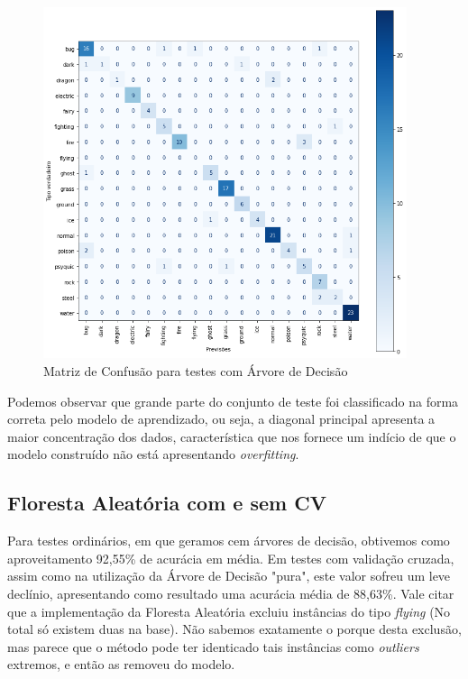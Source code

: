 \documentclass[12pt]{article}
\begin{document}
\begin{figure}[H]
    \centering
    \includegraphics[width=0.95\textwidth]{Images/confusion_matrix_tree.png}
    \caption{Matriz de Confusão para testes com Árvore de Decisão}
    \label{fig:exampleFig5}
\end{figure}

Podemos observar que grande parte do conjunto de teste foi classificado na forma correta pelo modelo de aprendizado, ou seja, a diagonal principal apresenta a maior concentração dos dados, característica que nos fornece um indício de que o modelo construído não está apresentando \emph{overfitting}.

\subsection{Floresta Aleatória com e sem CV}

Para testes ordinários, em que geramos cem árvores de decisão, obtivemos como aproveitamento 92,55\% de acurácia em média. Em testes com validação cruzada, assim como na utilização da Árvore de Decisão "pura", este valor sofreu um leve declínio, apresentando como resultado uma acurácia média de 88,63\%. Vale citar que a implementação da Floresta Aleatória excluiu instâncias do tipo \emph{flying} (No total só existem duas na base). Não sabemos exatamente o porque desta exclusão, mas parece que o método pode ter identicado tais instâncias como \emph{outliers} extremos, e então as removeu do modelo.
\end{document}
